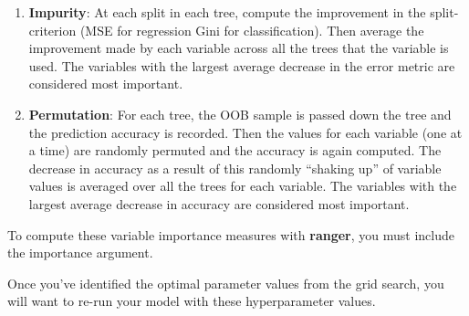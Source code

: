 \documentclass[]{book}
\providecommand{\tightlist}{%
  \setlength{\itemsep}{0pt}\setlength{\parskip}{0pt}}
\theoremstyle{definition}
\theoremstyle{definition}
\theoremstyle{definition}
\theoremstyle{remark}
\begin{document}
\begin{enumerate}
\def\labelenumi{\arabic{enumi}.}
\tightlist
\item
  \textbf{Impurity}: At each split in each tree, compute the improvement
  in the split-criterion (MSE for regression Gini for classification).
  Then average the improvement made by each variable across all the
  trees that the variable is used. The variables with the largest
  average decrease in the error metric are considered most important.
\item
  \textbf{Permutation}: For each tree, the OOB sample is passed down the
  tree and the prediction accuracy is recorded. Then the values for each
  variable (one at a time) are randomly permuted and the accuracy is
  again computed. The decrease in accuracy as a result of this randomly
  ``shaking up'' of variable values is averaged over all the trees for
  each variable. The variables with the largest average decrease in
  accuracy are considered most important.
\end{enumerate}

To compute these variable importance measures with \textbf{ranger}, you
must include the importance argument.

\begin{note}
Once you've identified the optimal parameter values from the grid
search, you will want to re-run your model with these hyperparameter
values.
\end{note}
\end{document}
